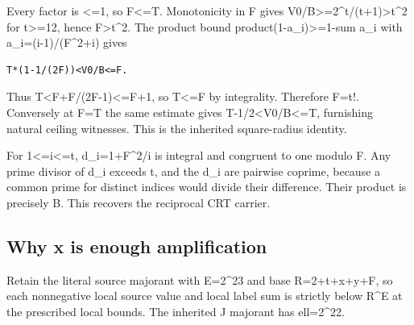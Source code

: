 Every factor is \textless{}\allowbreak{}=\allowbreak{}1, so F\textless{}\allowbreak{}=\allowbreak{}T. Monotonicity in F gives V0/\allowbreak{}B\textgreater{}\allowbreak{}=\allowbreak{}2\textasciicircum{}\allowbreak{}t/\allowbreak{}(t+\allowbreak{}1)\textgreater{}\allowbreak{}t\textasciicircum{}\allowbreak{}2 for t\textgreater{}\allowbreak{}=\allowbreak{}12, hence F\textgreater{}\allowbreak{}t\textasciicircum{}\allowbreak{}2. The product bound product(1-a\_\allowbreak{}i)\textgreater{}\allowbreak{}=\allowbreak{}1-sum a\_\allowbreak{}i with a\_\allowbreak{}i=\allowbreak{}(i-1)/\allowbreak{}(F\textasciicircum{}\allowbreak{}2+\allowbreak{}i) gives



\begin{verbatim}
T*(1-1/(2F))<V0/B<=F.
\end{verbatim}

Thus T\textless{}\allowbreak{}F+\allowbreak{}F/\allowbreak{}(2F-1)\textless{}\allowbreak{}=\allowbreak{}F+\allowbreak{}1, so T\textless{}\allowbreak{}=\allowbreak{}F by integrality. Therefore F=\allowbreak{}t!. Conversely at F=\allowbreak{}T the same estimate gives T-1/\allowbreak{}2\textless{}\allowbreak{}V0/\allowbreak{}B\textless{}\allowbreak{}=\allowbreak{}T, furnishing natural ceiling witnesses. This is the inherited square-radius identity.



For 1\textless{}\allowbreak{}=\allowbreak{}i\textless{}\allowbreak{}=\allowbreak{}t, d\_\allowbreak{}i=\allowbreak{}1+\allowbreak{}F\textasciicircum{}\allowbreak{}2/\allowbreak{}i is integral and congruent to one modulo F. Any prime divisor of d\_\allowbreak{}i exceeds t, and the d\_\allowbreak{}i are pairwise coprime, because a common prime for distinct indices would divide their difference. Their product is precisely B. This recovers the reciprocal CRT carrier.



\subsection{Why x is enough amplification}



Retain the literal source majorant with E=\allowbreak{}2\textasciicircum{}\allowbreak{}23 and base R=\allowbreak{}2+\allowbreak{}t+\allowbreak{}x+\allowbreak{}y+\allowbreak{}F, so each nonnegative local source value and local label sum is strictly below R\textasciicircum{}\allowbreak{}E at the prescribed local bounds. The inherited J majorant has ell=\allowbreak{}2\textasciicircum{}\allowbreak{}22.



